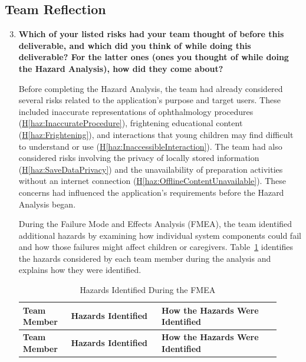 \documentclass{article}
\newcounter{hazard}
\newcommand{\hazref}[1]{\hyperref[haz:#1]{H\ref*{haz:#1}}}
\begin{document}
\subsection*{Team Reflection}

\begin{enumerate}
    \setcounter{enumi}{2}

    \item \textbf{Which of your listed risks had your team thought of before
    this deliverable, and which did you think of while doing this deliverable?
    For the latter ones (ones you thought of while doing the Hazard Analysis),
    how did they come about?}

    Before completing the Hazard Analysis, the team had
    already considered several risks related to the
    application's purpose and target users. These included
    inaccurate representations of ophthalmology procedures
    (\hazref{InaccurateProcedure}), frightening educational
    content (\hazref{Frightening}), and interactions that
    young children may find difficult to understand or use
    (\hazref{InaccessibleInteraction}). The team had also
    considered risks involving the privacy of locally stored
    information (\hazref{SaveDataPrivacy}) and the
    unavailability of preparation activities without an
    internet connection (\hazref{OfflineContentUnavailable}).
    These concerns had influenced the application's
    requirements before the Hazard Analysis began.

    During the Failure Mode and Effects Analysis (FMEA),
    the team identified additional hazards by examining
    how individual system components could fail and how
    those failures might affect children or caregivers.
    Table~\ref{tab:TeamHazardReflection} identifies
    the hazards considered by each team member during
    the analysis and explains how they were identified.

    \begin{longtable}{@{}
        p{0.17\linewidth}
        p{0.32\linewidth}
        p{0.42\linewidth}
    @{}}

    \caption{Hazards Identified During the FMEA}
    \label{tab:TeamHazardReflection}\\

    \toprule
    \textbf{Team Member} &
    \textbf{Hazards Identified} &
    \textbf{How the Hazards Were Identified} \\
    \midrule
    \endfirsthead

    \toprule
    \textbf{Team Member} &
    \textbf{Hazards Identified} &
    \textbf{How the Hazards Were Identified} \\
    \midrule
    \endhead


\end{longtable}
\end{enumerate}
\end{document}
